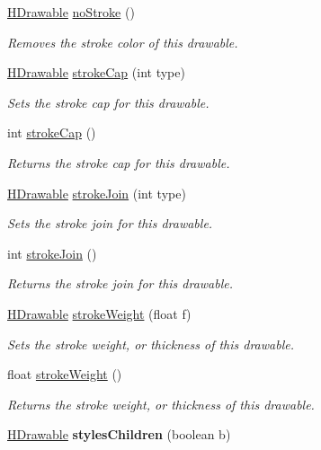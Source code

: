 \begin{DoxyCompactItemize}
\hyperlink{classhype_1_1core_1_1drawable_1_1_h_drawable}{H\-Drawable} \hyperlink{classhype_1_1core_1_1drawable_1_1_h_drawable_a356b4f191fa67f5d1a8071bf21cb9f4c}{no\-Stroke} ()
\begin{DoxyCompactList}\small\item\em Removes the stroke color of this drawable. \end{DoxyCompactList}\item 
\hyperlink{classhype_1_1core_1_1drawable_1_1_h_drawable}{H\-Drawable} \hyperlink{classhype_1_1core_1_1drawable_1_1_h_drawable_a6be0948b8687197c07087faac957745c}{stroke\-Cap} (int type)
\begin{DoxyCompactList}\small\item\em Sets the stroke cap for this drawable. \end{DoxyCompactList}\item 
int \hyperlink{classhype_1_1core_1_1drawable_1_1_h_drawable_ab9838a263f6daf6cc85f4fc7f7e038e2}{stroke\-Cap} ()
\begin{DoxyCompactList}\small\item\em Returns the stroke cap for this drawable. \end{DoxyCompactList}\item 
\hyperlink{classhype_1_1core_1_1drawable_1_1_h_drawable}{H\-Drawable} \hyperlink{classhype_1_1core_1_1drawable_1_1_h_drawable_a111ea8108bfe680fcdab67f8dd78e27e}{stroke\-Join} (int type)
\begin{DoxyCompactList}\small\item\em Sets the stroke join for this drawable. \end{DoxyCompactList}\item 
int \hyperlink{classhype_1_1core_1_1drawable_1_1_h_drawable_a4fc12f2585819b1bd9ed0fc60cac74c0}{stroke\-Join} ()
\begin{DoxyCompactList}\small\item\em Returns the stroke join for this drawable. \end{DoxyCompactList}\item 
\hyperlink{classhype_1_1core_1_1drawable_1_1_h_drawable}{H\-Drawable} \hyperlink{classhype_1_1core_1_1drawable_1_1_h_drawable_a921f850d18263460a9a7117364262157}{stroke\-Weight} (float f)
\begin{DoxyCompactList}\small\item\em Sets the stroke weight, or thickness of this drawable. \end{DoxyCompactList}\item 
float \hyperlink{classhype_1_1core_1_1drawable_1_1_h_drawable_ab442156bac301c3e89040cbc1d90ce84}{stroke\-Weight} ()
\begin{DoxyCompactList}\small\item\em Returns the stroke weight, or thickness of this drawable. \end{DoxyCompactList}\item 
\hypertarget{classhype_1_1core_1_1drawable_1_1_h_drawable_a4cb253a232e570ffab6bd585143535ad}{\hyperlink{classhype_1_1core_1_1drawable_1_1_h_drawable}{H\-Drawable} {\bfseries styles\-Children} (boolean b)}\label{classhype_1_1core_1_1drawable_1_1_h_drawable_a4cb253a232e570ffab6bd585143535ad}


\end{DoxyCompactItemize}
